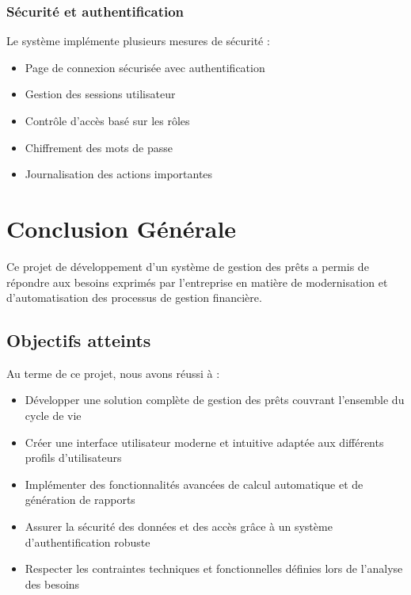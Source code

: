 \documentclass[12pt,a4paper]{report}
\begin{document}
\subsection{Sécurité et authentification}

Le système implémente plusieurs mesures de sécurité :
\begin{itemize}
    \item Page de connexion sécurisée avec authentification
    \item Gestion des sessions utilisateur
    \item Contrôle d'accès basé sur les rôles
    \item Chiffrement des mots de passe
    \item Journalisation des actions importantes
\end{itemize}

\newpage

\chapter*{Conclusion Générale}

Ce projet de développement d'un système de gestion des prêts a permis de répondre aux besoins exprimés par l'entreprise en matière de modernisation et d'automatisation des processus de gestion financière.

\section*{Objectifs atteints}

Au terme de ce projet, nous avons réussi à :

\begin{itemize}
    \item Développer une solution complète de gestion des prêts couvrant l'ensemble du cycle de vie
    \item Créer une interface utilisateur moderne et intuitive adaptée aux différents profils d'utilisateurs
    \item Implémenter des fonctionnalités avancées de calcul automatique et de génération de rapports
    \item Assurer la sécurité des données et des accès grâce à un système d'authentification robuste
    \item Respecter les contraintes techniques et fonctionnelles définies lors de l'analyse des besoins
\end{itemize}
\end{document}
